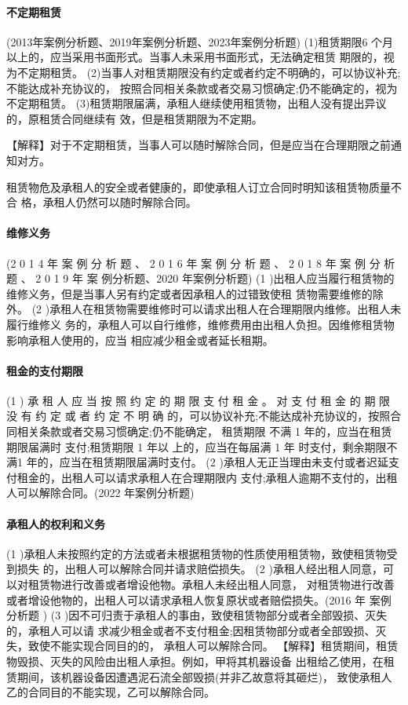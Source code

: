 \documentclass[UTF8,12pt]{ctexart}
\numberwithin{equation}{section} %
\numberwithin{figure}{section}
\numberwithin{table}{section}
\begin{document}
	\paragraph{不定期租赁}(2013年案例分析题、2019年案例分析题、2023年案例分析题) (1)租赁期限6 个月以上的，应当采用书面形式。当事人未采用书面形式，无法确定租赁 期限的，视为不定期租赁。 (2)当事人对租赁期限没有约定或者约定不明确的，可以协议补充;不能达成补充协议的， 按照合同相关条款或者交易习惯确定;仍不能确定的，视为不定期租赁。 (3)租赁期限届满，承租人继续使用租赁物，出租人没有提出异议的，原租赁合同继续有 效，但是租赁期限为不定期。
	
	【解释】对于不定期租赁，当事人可以随时解除合同，但是应当在合理期限之前通知对方。
	
	租赁物危及承租人的安全或者健康的，即使承租人订立合同时明知该租赁物质量不合 格，承租人仍然可以随时解除合同。
	
	\paragraph{维修义务} (2 0 1 4 年 案 例 分 析 题 、 2 0 1 6 年 案 例 分 析 题 、 2 0 1 8 年 案 例 分 析 题 、 2 0 1 9 年 案 例分析题、2020 年案例分析题)
	(1 )出租人应当履行租赁物的维修义务，但是当事人另有约定或者因承租人的过错致使租 赁物需要维修的除外。
	(2 )承租人在租赁物需要维修时可以请求出租人在合理期限内维修。出租人未履行维修义 务的，承租人可以自行维修，维修费用由出租人负担。因维修租赁物影响承租人使用的，应当 相应减少租金或者延长租期。
	
	\paragraph{租金的支付期限}
	(1 ) 承 租 人 应 当 按 照 约 定 的 期 限 支 付 租 金 。 对 支 付 租 金 的 期 限 没 有 约 定 或 者 约 定 不 明 确 的，可以协议补充;不能达成补充协议的，按照合同相关条款或者交易习惯确定;仍不能确定，
	租赁期限 不满 1 年的，应当在租赁期限届满时 支付;租赁期限 1 年以 上的，应当在每届满 1 年 时支付，剩余期限不满1 年的，应当在租赁期限届满时支付。
	(2 )承租人无正当理由未支付或者迟延支付租金的，出租人可以请求承租人在合理期限内 支付;承租人逾期不支付的，出租人可以解除合同。(2022 年案例分析题)
	
	\paragraph{承租人的权利和义务}
	(1 )承租人未按照约定的方法或者未根据租赁物的性质使用租赁物，致使租赁物受到损失 的，出租人可以解除合同并请求赔偿损失。
	(2 )承租人经出租人同意，可以对租赁物进行改善或者增设他物。承租人未经出租人同意， 对租赁物进行改善或者增设他物的，出租人可以请求承租人恢复原状或者赔偿损失。(2016 年 案例分析题 )
	(3 )因不可归责于承租人的事由，致使租赁物部分或者全部毁损、灭失的，承租人可以请 求减少租金或者不支付租金;因租赁物部分或者全部毁损、灭失，致使不能实现合同目的的，
	承租人可以解除合同。
	【解释】租赁期间，租赁物毁损、灭失的风险由出租人承担。例如，甲将其机器设备 出租给乙使用，在租赁期间，该机器设备因遭遇泥石流全部毁损(并非乙故意将其砸烂)，
	致使承租人乙的合同目的不能实现，乙可以解除合同。
	
\end{document}
